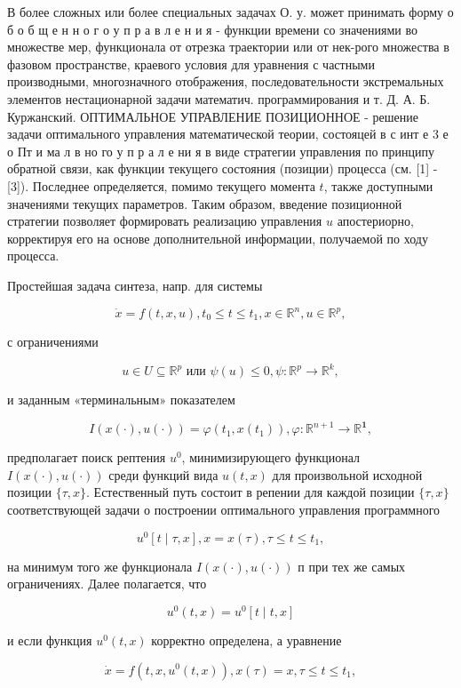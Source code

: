\documentclass[10pt]{article}
\begin{document}
В более сложных или более специальных задачах О. у. может принимать форму о б о б щ е н н о г о у п р а в л е н и я - функции времени со значениями во множестве мер, функционала от отрезка траектории или от нек-рого множества в фазовом пространстве, краевого условия для уравнения с частными производными, многозначного отображения, последовательности экстремальных элементов нестационарной задачи математич. программирования и т. Д. А. Б. Куржанский. ОПТИМАЛЬНОЕ УПРАВЛЕНИЕ ПОЗИЦИОННОЕ - решение задачи оптимального управления математической теории, состояцей в с инт е 3 е о Пт и ма л в но го у п р а л е ни я в виде стратегии управления по принципу обратной связи, как функции текущего состояния (позиции) процесса (см. [1] - [3]). Последнее определяется, помимо текущего момента $t$, также доступными значениями текущих параметров. Таким образом, введение позиционной стратегии позволяет формировать реализацию управления $u$ апостериорно, корректируя его на основе дополнительной информации, получаемой по ходу процесса.

Простейшая задача синтеза, напр. для системы

\[
\dot{x}=f(t, x, u), t_{0} \leqslant t \leqslant t_{1}, x \in \mathbb{R}^{n}, u \in \mathbb{R}^{p},
\]

с ограничениями

\[
u \in U \subseteq \mathbb{R}^{p} \text { или } \psi(u) \leqslant 0, \psi: \mathbb{R}^{p} \longrightarrow \mathbb{R}^{k},
\]

и заданным «терминальным» показателем

\[
I(x(\cdot), u(\cdot))=\varphi\left(t_{1}, x\left(t_{1}\right)\right), \varphi: \mathbb{R}^{n+1} \longrightarrow \mathbb{R}^{\mathbf{1}},
\]

предполагает поиск рептения $u^{0}$, минимизирующего функционал $I(x(\cdot), u(\cdot))$ среди функций вида $u(t, x)$ для произвольной исходной позиции $\{\tau, x\}$. Естественный путь состоит в репении для каждой позиции $\{\tau, x\}$ соответствующей задачи о построении оптимального управления программного

\[
u^{0}[t \mid \tau, x], x=x(\tau), \tau \leqslant t \leqslant t_{1},
\]

на минимум того же функционала $I(x(\cdot), u(\cdot))$ п при тех же самых ограничениях. Далее полагается, что

\[
u^{0}(t, x)=u^{0}[t \mid t, x]
\]

и если функция $u^{0}(t, x)$ корректно определена, а уравнение

\[
\dot{x}=f\left(t, x, u^{0}(t, x)\right), x(\tau)=x, \tau \leqslant t \leqslant t_{1},
\]
\end{document}
